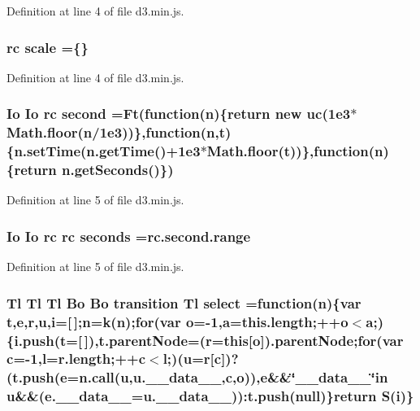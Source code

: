 Definition at line 4 of file d3.\+min.\+js.

\subsubsection[{scale}]{ {\bf rc} scale =\{\}}\label{d3_8min_8js_aa58657610c4764f2bab5acd79b6beb84}


Definition at line 4 of file d3.\+min.\+js.

\subsubsection[{second}]{ {\bf Io} {\bf Io} {\bf rc} second =Ft(function({\bf n})\{{\bf return} new {\bf uc}(1e3$\ast$\+Math.\+floor(n/1e3))\},function(n,t)\{n.\+set\+Time(n.\+get\+Time()+1e3$\ast$\+Math.\+floor(t))\},function(n)\{return n.\+get\+Seconds()\})}\label{d3_8min_8js_a46f1ef3d8bae6b3128b9e18ca84c076b}


Definition at line 5 of file d3.\+min.\+js.

\subsubsection[{seconds}]{ {\bf Io} {\bf Io} {\bf rc} {\bf rc} seconds ={\bf rc.\+second.\+range}}\label{d3_8min_8js_ad69a754c7a7ac6480b093b2d9e21cb30}


Definition at line 5 of file d3.\+min.\+js.

\subsubsection[{select}]{ {\bf Tl} {\bf Tl} {\bf Tl} {\bf Bo} {\bf Bo} {\bf transition} {\bf Tl} select =function({\bf n})\{var t,{\bf e},{\bf r},u,{\bf i}=[$\,$];{\bf n}=k({\bf n});{\bf for}(var {\bf o}=-\/1,{\bf a}=this.\+length;++{\bf o}$<${\bf a};)\{i.\+push(t=[$\,$]),t.\+parent\+Node=({\bf r}={\bf this}[{\bf o}]).parent\+Node;{\bf for}(var {\bf c}=-\/1,l=r.\+length;++{\bf c}$<$l;)(u={\bf r}[{\bf c}])?(t.\+push({\bf e}={\bf n.\+call}(u,u.\+\_\+\+\_\+data\+\_\+\+\_\+,{\bf c},{\bf o})),{\bf e}\&\&\char`\"{}\+\_\+\+\_\+data\+\_\+\+\_\+\char`\"{}in u\&\&(e.\+\_\+\+\_\+data\+\_\+\+\_\+=u.\+\_\+\+\_\+data\+\_\+\+\_\+))\+:t.\+push(null)\}{\bf return} S({\bf i})\}}\label{d3_8min_8js_a610efefd9c334eba1bc9a912d8c941b1}


